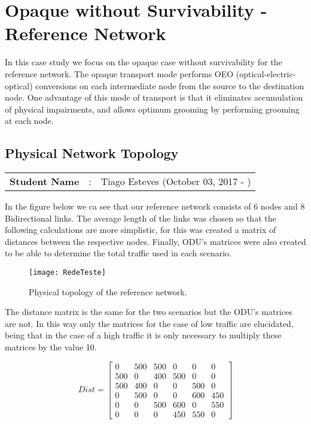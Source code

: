 \clearpage

\section{Opaque without Survivability - Reference Network} \label{Reference_Network}

In this case study we focus on the opaque case without survivability for the reference network.
The opaque transport mode performs OEO (optical-electric-optical) conversions on each intermediate node from the source to the destination node.
One advantage of this mode of transport is that it eliminates accumulation of physical impairments, and allows optimum grooming by performing grooming at each node.

\subsection{Physical Network Topology}\label{Reference_Network_Topology}
\begin{tcolorbox}	
\begin{tabular}{p{2.75cm} p{0.2cm} p{10.5cm}} 	
\textbf{Student Name}  &:& Tiago Esteves    (October 03, 2017 - )\\
\end{tabular}
\end{tcolorbox}


In the figure below we ca see that our reference network consists of 6 nodes and 8 Bidirectional links.
The average length of the links was chosen so that the following calculations are more simplistic, for this was created a matrix of distances between the respective nodes.
Finally, ODU's matrices were also created to be able to determine the total traffic used in each scenario.

\begin{figure}[h!]
\centering
\texttt{[image: RedeTeste]}
\caption{Physical topology of the reference network.}
\end{figure}

The distance matrix is the same for the two scenarios but the ODU's matrices are not.
In this way only the matrices for the case of low traffic are elucidated, being that in the case of a high traffic it is only necessary to multiply these matrices by the value 10.

\[
Dist=
  \begin{bmatrix}
    0 & 500 & 500 & 0 & 0 & 0 \\
    500 & 0 & 400 & 500 & 0 & 0 \\
    500 & 400 & 0 & 0 & 500 & 0 \\
    0 & 500 & 0 & 0 & 600 & 450 \\
    0 & 0 & 500 & 600 & 0 & 550 \\
    0 & 0 & 0 & 450 & 550 & 0
  \end{bmatrix}
\]

